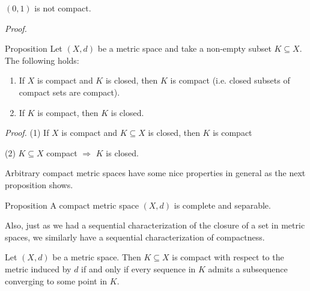 \documentclass [aspectratio=169]{beamer}
\begin{document}
\begin{frame}
\begin{example}
$(0,1)$ is not compact. 
\end{example}
\textit{Proof.}
\vspace{4cm}
\end{frame}


\begin{frame}
\begin{exampleblock}{Proposition}
Let $(X,d)$ be a metric space and take a non-empty subset $K\subseteq X$. The following holds:
\begin{enumerate}
    \item If $X$ is compact and $K$ is closed, then $K$ is compact (i.e. closed subsets of compact sets are compact).
    \item If $K$ is compact, then $K$ is closed.
\end{enumerate}
\end{exampleblock}
\end{frame}


\begin{frame}
\textit{Proof.}
(1) If $X$ is compact and $K \subseteq X$ is closed, then $K$ is compact
\vspace{6cm}

\end{frame}


\begin{frame}

(2) $K \subseteq X$ compact $\Rightarrow$ $K$ is closed.
\vspace{6cm}


\end{frame}

\begin{frame}

\end{frame}



\begin{frame}

Arbitrary compact metric spaces have some nice properties in general as the next proposition shows.

\begin{exampleblock}{Proposition}
    A compact metric space $(X,d)$ is complete and separable.
\end{exampleblock}

\vspace{1em}

Also, just as we had a sequential characterization of the closure of a set in metric spaces, we similarly have a sequential characterization of compactness. 

\begin{theorem}
Let $(X,d)$ be a metric space. Then $K\subseteq X$ is compact with respect to the metric induced by $d$ if and only if every sequence in $K$ admits a subsequence converging to some point in $K$.
\end{theorem}



\end{frame}
\end{document}
